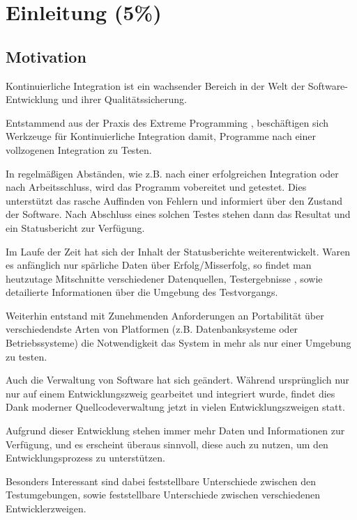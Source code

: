 \chapter{Einleitung (5\%) }

\section{Motivation}

Kontinuierliche Integration ist ein wachsender Bereich
in der Welt der Software-Entwicklung und ihrer Qualitätssicherung.

Entstammend aus der Praxis des Extreme Programming
\cite{xp:explained, folwer:xp},
beschäftigen sich Werkzeuge für Kontinuierliche Integration damit,
Programme nach einer vollzogenen Integration zu Testen.

In regelmäßigen Abständen, wie z.B. nach einer erfolgreichen Integration oder nach Arbeitsschluss,
wird das Programm vobereitet und getestet.
Dies unterst\"utzt das rasche Auffinden von Fehlern
und informiert \"uber den Zustand der Software.
Nach Abschluss eines solchen Testes stehen dann das Resultat
und ein Statusbericht zur Verf\"ugung.

Im Laufe der Zeit hat sich der Inhalt der Statusberichte weiterentwickelt.
Waren es anf\"anglich nur sp\"arliche Daten \"uber Erfolg/Misserfolg,
so findet man heutzutage Mitschnitte verschiedener Datenquellen, Testergebnisse
\cite{jenkins:junitxml}, sowie detailierte Informationen \"uber die Umgebung des Testvorgangs.

Weiterhin entstand mit Zunehmenden Anforderungen an Portabilit\"at \"uber
verschiedendste Arten von Platformen (z.B. Datenbanksysteme oder Betriebssysteme)
die Notwendigkeit das System in mehr als nur einer Umgebung zu testen.

Auch die Verwaltung von Software hat sich ge\"andert.
W\"ahrend urspr\"unglich nur nur auf einem Entwicklungszweig gearbeitet und integriert wurde,
findet dies Dank moderner Quellcodeverwaltung jetzt in vielen Entwicklungszweigen statt.
\cite{dvcs:vorteile, dvcs:entwicklungsmodelle}

Aufgrund dieser Entwicklung stehen immer mehr Daten und Informationen zur Verf\"ugung,
und es erscheint \"uberaus sinnvoll, diese auch zu nutzen, um den Entwicklungsprozess zu unterst\"utzen.

Besonders Interessant sind dabei feststellbare Unterschiede zwischen den Testumgebungen,
sowie feststellbare Unterschiede zwischen verschiedenen Entwicklerzweigen.

